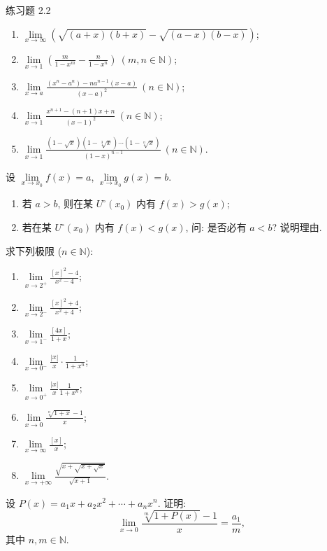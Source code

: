 \begin{exblock}{练习题 2.2}
\begin{enumerate}[label=(\arabic*)]
    \item $\lim\limits_{x\to\infty}\left(\sqrt{(a+x)(b+x)}-\sqrt{(a-x)(b-x)}\right)$;
    \item $\lim\limits_{x \to 1} \left( \frac{m}{1 - x^m} - \frac{n}{1 - x^n} \right)\ (m, n \in \mathbb{N})$;
    \item $\lim\limits_{x \to a} \frac{(x^n - a^n) - na^{n-1}(x - a)}{(x - a)^2}\ (n \in \mathbb{N})$;
    \item $\lim\limits_{x \to 1} \frac{x^{n+1} - (n+1)x + n}{(x-1)^2}\ (n \in \mathbb{N})$;
    \item $\lim\limits_{x \to 1} \frac{(1-\sqrt{x})(1-\sqrt[3]{x}) \cdots (1-\sqrt[n]{x})}{(1-x)^{n-1}}\ (n \in \mathbb{N})$.
  \end{enumerate}

\item 设 $\lim\limits_{x\to x_0}f(x)=a$, $\lim\limits_{x\to x_0}g(x)=b$.
  \begin{enumerate}[label=(\arabic*)]
    \item 若 $a > b$, 则在某 $U^{\circ}(x_{0})$ 内有 $f(x) > g(x)$;
    \item 若在某 $U^{\circ}(x_{0})$ 内有 $f(x)<g(x)$, 问: 是否必有 $a<b$? 说明理由.
  \end{enumerate}

\item 求下列极限 ($n\in\mathbb{N}$):
  \begin{enumerate}[label=(\arabic*)]
    \item $\lim\limits_{x \to 2^{+}} \frac{[x]^{2} - 4}{x^{2} - 4}$;
    \item $\lim\limits_{x \to 2^{-}} \frac{[x]^{2} + 4}{x^{2} + 4}$;
    \item $\lim\limits_{x \to 1^-} \frac{[4x]}{1+x}$;
    \item $\lim\limits_{x \to 0^-} \frac{|x|}{x} \cdot \frac{1}{1 + x^n}$;
    \item $\lim\limits_{x\to 0^{+}}\frac{|x|}{x}\frac{1}{1+x^{n}}$;
    \item $\lim\limits_{x \to 0} \frac{\sqrt[n]{1+x}-1}{x}$;
    \item $\lim\limits_{x \to \infty} \frac{[x]}{x}$;
    \item $\lim\limits_{x \to +\infty} \frac{\sqrt{x + \sqrt{x + \sqrt{x}}}}{\sqrt{x + 1}}$.
  \end{enumerate}

\item 设 $P(x)=a_{1}x+a_{2}x^{2}+\cdots+a_{n}x^{n}$. 证明:
  \[
  \lim_{x\to 0}\frac{\sqrt[m]{1+P(x)}-1}{x}=\frac{a_{1}}{m},
\]
  其中 $n, m \in \mathbb{N}$.


\end{exblock}
